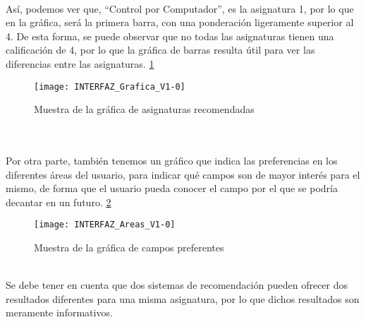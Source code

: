 \\Así, podemos ver que, ``Control por Computador'', es la asignatura 1, por lo que en la gráfica, será la primera barra, con una ponderación ligeramente superior al 4. De esta forma, se puede observar que no todas las asignaturas tienen una calificación de 4, por lo que la gráfica de barras resulta útil para ver las diferencias entre las asignaturas. \ref{fig:E.2.11} 
\begin{figure}[h]
\centering
\texttt{[image: INTERFAZ\_Grafica\_V1-0]}
\caption{Muestra de la gráfica de asignaturas recomendadas}
\label{fig:E.2.11}
\end{figure}
\\\\Por otra parte, también tenemos un gráfico que indica las preferencias en los diferentes áreas del usuario, para indicar qué campos son de mayor interés para el mismo, de forma que el usuario pueda conocer el campo por el que se podría decantar en un futuro. \ref{fig:E.2.12} 
\begin{figure}[h]
\centering
\texttt{[image: INTERFAZ\_Areas\_V1-0]}
\caption{Muestra de la gráfica de campos preferentes}
\label{fig:E.2.12}
\end{figure}
\\
Se debe tener en cuenta que dos sistemas de recomendación pueden ofrecer dos resultados diferentes para una misma asignatura, por lo que dichos resultados son meramente informativos. 

